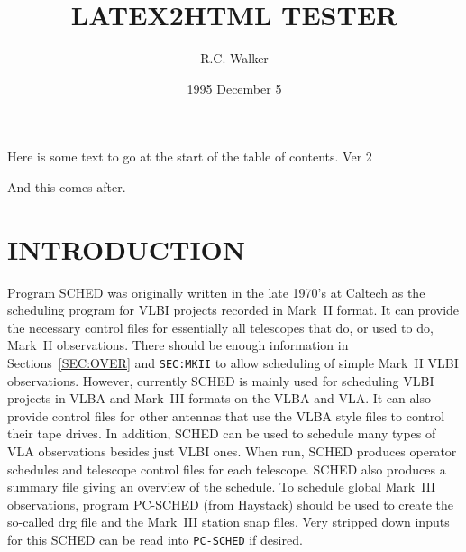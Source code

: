 \renewcommand{\textfraction}{0.0}
\renewcommand{\topfraction}{1.0}
\renewcommand{\bottomfraction}{1.0}
%
%
%
%

\def\rcwbox#1#2#3#4#5{
\begin{description}
\item[Argument:] #1
\item[Options:]  #2
\item[Default:]  #3
\item[Usage:]    #4
\item[Example:]  #5
\end{description}
}


\title{LATEX2HTML TESTER}
\author{R.C. Walker}
\date{1995 December 5}
\maketitle

Here is some text to go at the start of the table of contents.
Ver 2

\tableofcontents

And this comes after.

\newpage
\section{INTRODUCTION}
\label{SEC:INTRO}

Program {\sc SCHED} was originally written in the late 1970's at
Caltech as the scheduling program for VLBI projects recorded in
Mark~II format. It can provide the necessary control files for
essentially all telescopes that do, or used to do, Mark~II
observations. There should be enough information in
Sections~\ref{SEC:OVER} and {\tt SEC:MKII} to allow scheduling of
simple Mark~II VLBI observations. However, currently {\sc SCHED} is
mainly used for scheduling VLBI projects in VLBA and Mark~III formats
on the VLBA and VLA. It can also provide control files for other
antennas that use the VLBA style files to control their tape
drives. In addition, {\sc SCHED} can be used to schedule many types of
VLA observations besides just VLBI ones. When run, {\sc SCHED}
produces operator schedules and telescope control files for each
telescope. {\sc SCHED} also produces a summary file giving an overview
of the schedule. To schedule global Mark~III observations, program
{\sc PC-SCHED} (from Haystack) should be used to create the so-called
drg file and the Mark~III station snap files. Very stripped down
inputs for this {\sc SCHED} can be read into {\tt PC-SCHED} if
desired.


